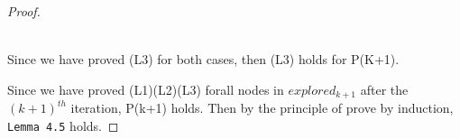 \begin{proof}
\begin{itemize}
\begin{enumerate}
  \\
  Since we have proved (L3) for both cases, then (L3) holds for P(K+1). 
  \end{enumerate}
\end{itemize}
Since we have proved (L1)(L2)(L3) forall nodes in $explored_{k+1}$ after the $(k+1)^{th}$ iteration, P(k+1) holds. Then by the principle of prove by induction, \texttt{Lemma 4.5} holds. 
\end{proof}
